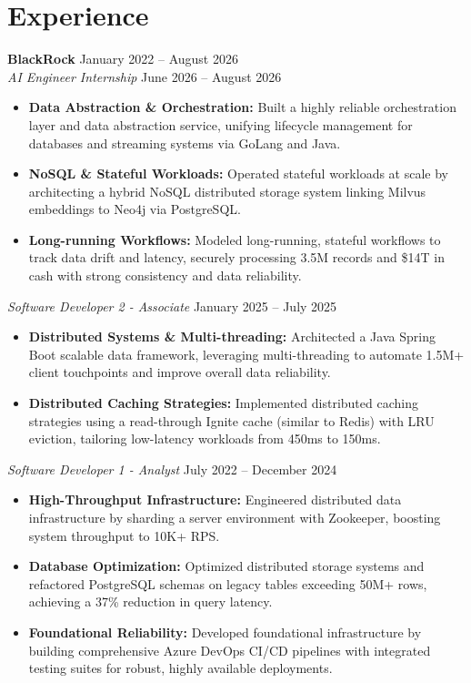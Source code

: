 \documentclass[11pt,a4paper]{article}
\begin{document}
\section{Experience}
\noindent
\textbf{BlackRock} \hfill January 2022 -- August 2026 \\
\textit{AI Engineer Internship} \hfill June 2026 -- August 2026
\begin{itemize}[leftmargin=*,noitemsep,topsep=0pt]
    \item \textbf{Data Abstraction \& Orchestration:} Built a highly reliable orchestration layer and data abstraction service, unifying lifecycle management for databases and streaming systems via GoLang and Java.
    \item \textbf{NoSQL \& Stateful Workloads:} Operated stateful workloads at scale by architecting a hybrid NoSQL distributed storage system linking Milvus embeddings to Neo4j via PostgreSQL.
    \item \textbf{Long-running Workflows:} Modeled long-running, stateful workflows to track data drift and latency, securely processing 3.5M records and \$14T in cash with strong consistency and data reliability.
\end{itemize}

\vspace{3pt}
\noindent
\textit{Software Developer 2 - Associate} \hfill January 2025 -- July 2025
\begin{itemize}[leftmargin=*,noitemsep,topsep=0pt]
    \item \textbf{Distributed Systems \& Multi-threading:} Architected a Java Spring Boot scalable data framework, leveraging multi-threading to automate 1.5M+ client touchpoints and improve overall data reliability.
    \item \textbf{Distributed Caching Strategies:} Implemented distributed caching strategies using a read-through Ignite cache (similar to Redis) with LRU eviction, tailoring low-latency workloads from 450ms to 150ms.
\end{itemize}

\vspace{3pt}
\noindent
\textit{Software Developer 1 - Analyst} \hfill July 2022 -- December 2024
\begin{itemize}[leftmargin=*,noitemsep,topsep=0pt]
    \item \textbf{High-Throughput Infrastructure:} Engineered distributed data infrastructure by sharding a server environment with Zookeeper, boosting system throughput to 10K+ RPS.
    \item \textbf{Database Optimization:} Optimized distributed storage systems and refactored PostgreSQL schemas on legacy tables exceeding 50M+ rows, achieving a 37\% reduction in query latency.
    \item \textbf{Foundational Reliability:} Developed foundational infrastructure by building comprehensive Azure DevOps CI/CD pipelines with integrated testing suites for robust, highly available deployments.
\end{itemize}
\end{document}
